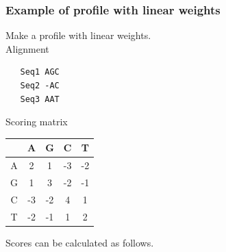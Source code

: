 %
%
\subsubsection*{Example of profile with linear weights}

Make a profile with linear weights. \\

\noindent
Alignment
\begin{verbatim}
   Seq1 AGC
   Seq2 -AC
   Seq3 AAT
\end{verbatim}

\medskip 

\noindent
Scoring matrix
\begin{table}[H]
\centering
\small
\begin{tabular}{|c|c|c|c|c|}
\hline
  & A  & G  & C  & T  \\ \hline
A & 2  & 1  & -3 & -2 \\ \hline
G & 1  & 3  & -2 & -1 \\ \hline
C & -3 & -2 & 4  & 1  \\ \hline
T & -2 & -1 & 1  & 2  \\ \hline
\end{tabular}
\end{table}

\noindent
Scores can be calculated as follows. \\

